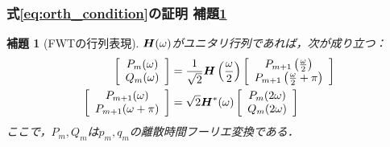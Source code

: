 \documentclass[dvipdfmx,graphicx,14pt]{beamer}
\newtheorem{mylemma}{補題}
\begin{document}
\begin{frame}[c]
    \frametitle{式\eqref{eq:orth_condition}の証明 補題\ref{lem:fwt_freq}}
    \begin{mylemma}[FWTの行列表現]
        $\boldsymbol{H}(\omega)$がユニタリ行列であれば，次が成り立つ：
        \small
        \begin{align}
            \left[\begin{array}{c}
                P_{m}(\omega) \\
                Q_{m}(\omega)
            \end{array}\right]
            &=
            \frac{1}{\sqrt{2}} \boldsymbol{H}\left(\frac{\omega}{2}\right)
            \left[\begin{array}{c}
                P_{m+1}\left(\frac{\omega}{2}\right) \\
                P_{m+1}\left(\frac{\omega}{2} + \pi\right)
            \end{array}\right] \label{eq:mra_downsampling} \\
            \left[\begin{array}{c}
                P_{m+1}(\omega) \\
                P_{m+1}(\omega + \pi)
            \end{array}\right]
            &=
            \sqrt{2} \boldsymbol{H}^{\ast}(\omega)
            \left[\begin{array}{c}
                P_{m}(2\omega) \\
                Q_{m}(2\omega)
            \end{array}\right] \label{eq:mra_upsampling}
        \end{align}
        \normalsize
        ここで，$P_{m}, Q_{m}$は$p_{m}, q_{m}$の離散時間フーリエ変換である．
        \label{lem:fwt_freq}
    \end{mylemma}
\end{frame}
\end{document}
